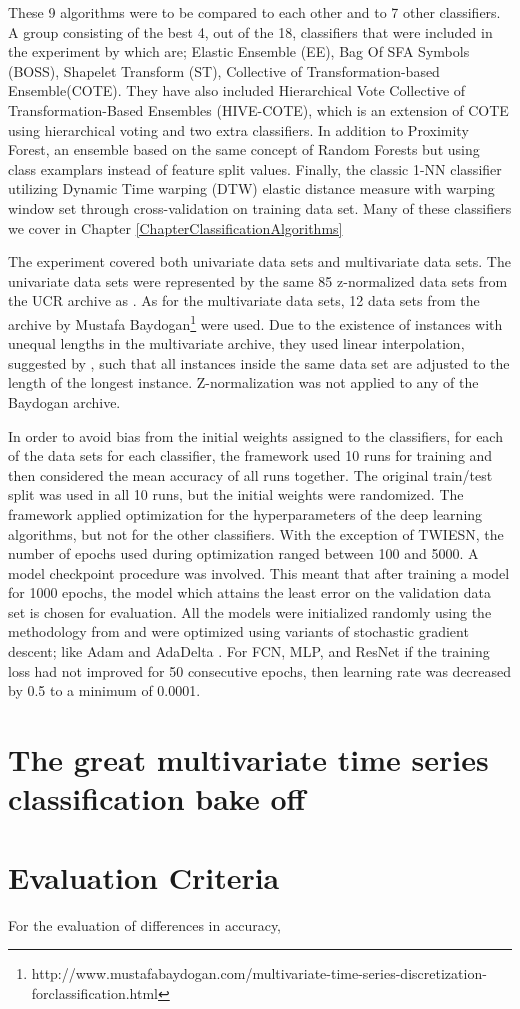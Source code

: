 These 9 algorithms were to be compared to each other and to 7 other classifiers.
A group consisting of the best 4, out of the 18, classifiers that were included in the experiment by \cite{bagnall2017great} which are; Elastic Ensemble (EE), Bag Of SFA Symbols (BOSS), Shapelet Transform (ST), Collective of Transformation-based Ensemble(COTE).
They have also included Hierarchical Vote Collective of Transformation-Based Ensembles (HIVE-COTE), which is an extension of COTE using hierarchical voting and two extra classifiers.
In addition to Proximity Forest, an ensemble based on the same concept of Random Forests but using class examplars instead of feature split values.
Finally, the classic 1-NN classifier utilizing Dynamic Time warping (DTW) elastic distance measure with warping window set through cross-validation on training data set.
Many of these classifiers we cover in Chapter \ref{ChapterClassificationAlgorithms}

The experiment covered both univariate data sets and multivariate data sets. The univariate data sets were represented by the same 85 z-normalized data sets from the UCR archive as \cite{bagnall2017great}.
As for the multivariate data sets, 12 data sets from the archive by Mustafa Baydogan\footnote{http://www.mustafabaydogan.com/multivariate-time-series-discretization-forclassification.html}
were used. Due to the existence of instances with unequal lengths in the multivariate archive, they used linear interpolation, suggested by \cite{ratanamahatana2005three},
such that all instances inside the same data set are adjusted to the length of the longest instance. Z-normalization was not applied to any of the Baydogan archive.

In order to avoid bias from the initial weights assigned to the classifiers, for each of the data sets for each classifier, the framework used 10 runs for training and then considered the mean accuracy of all runs together.
The original train/test split was used in all 10 runs, but the initial weights were randomized.
The framework applied optimization for the hyperparameters of the deep learning algorithms, but not for the other classifiers.
With the exception of TWIESN, the number of epochs used during optimization ranged between 100 and 5000.
A model checkpoint procedure was involved. This meant that after training a model for 1000 epochs, the model which attains the least error on the validation data set is chosen for evaluation.
All the models were initialized randomly using the methodology from \cite{glorot2010understanding} and were optimized using variants of stochastic gradient descent; like Adam \cite{kingma2014adam} and AdaDelta \cite{zeiler2012adadelta}.
For FCN, MLP, and ResNet if the training loss had not improved for 50 consecutive epochs, then learning rate was decreased by 0.5 to a minimum of 0.0001.

\section{The great multivariate time series classification bake off}
\label{GreatBakeoffMultivariate}

\section{Evaluation Criteria}
\label{ReviewsEvaluation}
For the evaluation of differences in accuracy,


